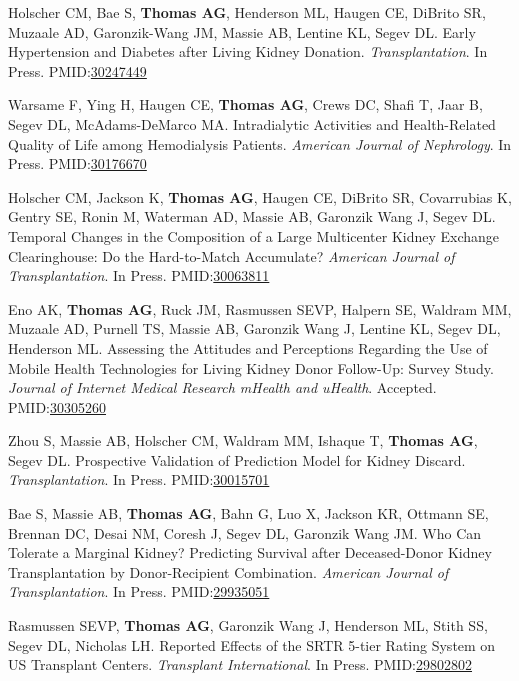 \documentclass[10pt]{article}
\makeatletter
\newlength{\bibhang}
\newlength{\bibsep}
 {\@listi \global\bibsep\itemsep \global\advance\bibsep by\parsep}
\newenvironment{bibenum*}
  {\renewcommand\labelenumi{[\theenumi]}%
   \etaremune[
     topsep=0pt,
     itemsep=\bibsep,
     parsep=0pt,partopsep=0pt,
     itemindent=-\bibhang,
     leftmargin={\bibhang+\widthof{[999]}}]}
  {\endetaremune}
\newcommand{\pmid}[1]{PMID:\href{https://www.ncbi.nlm.nih.gov/pubmed/#1}{#1}}
\makeatother
\begin{document}
\begin{bibenum*}
\item Holscher CM, Bae S, \textbf{Thomas AG}, Henderson ML, Haugen CE,
  DiBrito SR, Muzaale AD, Garonzik-Wang JM, Massie AB, Lentine KL, Segev DL.
  Early Hypertension and Diabetes after Living Kidney Donation.
  \emph{Transplantation}. In Press.
  \pmid{30247449} 

\item Warsame F, Ying H, Haugen CE, \textbf{Thomas AG}, Crews DC, Shafi T,
  Jaar B, Segev DL, McAdams-DeMarco MA. Intradialytic Activities and
  Health-Related Quality of Life among Hemodialysis Patients.
  \emph{American Journal of Nephrology}. In Press.
  \pmid{30176670} 

\item Holscher CM, Jackson K, \textbf{Thomas AG}, Haugen CE, DiBrito SR,
  Covarrubias K, Gentry SE, Ronin M, Waterman AD, Massie AB,
  Garonzik Wang J, Segev DL.
  Temporal Changes in the Composition of a Large Multicenter Kidney
  Exchange Clearinghouse: Do the Hard-to-Match Accumulate?
  \emph{American Journal of Transplantation}. In Press.
  \pmid{30063811} 

\item Eno AK, \textbf{Thomas AG}, Ruck JM, Rasmussen SEVP,
  Halpern SE, Waldram MM, Muzaale AD, Purnell TS, Massie AB,
  Garonzik Wang J, Lentine KL, Segev DL, Henderson ML.
  Assessing the Attitudes and Perceptions Regarding the Use of Mobile Health Technologies for Living Kidney Donor Follow-Up: Survey Study.
  \emph{Journal of Internet Medical Research mHealth and uHealth}.
  Accepted.
  \pmid{30305260} 

\item Zhou S, Massie AB, Holscher CM, Waldram MM, Ishaque T,
  \textbf{Thomas AG}, Segev DL. Prospective Validation of Prediction
  Model for Kidney Discard.
  \emph{Transplantation}. In Press.
  \pmid{30015701} 

\item Bae S, Massie AB, \textbf{Thomas AG}, Bahn G, Luo X, Jackson KR,
  Ottmann SE, Brennan DC, Desai NM, Coresh J, Segev DL, Garonzik Wang JM.
  Who Can Tolerate a Marginal Kidney? Predicting Survival after
  Deceased-Donor Kidney Transplantation by Donor-Recipient Combination.
  \emph{American Journal of Transplantation}. In Press.
  \pmid{29935051} 

\item Rasmussen SEVP, \textbf{Thomas AG}, Garonzik Wang J,
  Henderson ML, Stith SS, Segev DL, Nicholas LH. Reported Effects
  of the SRTR 5-tier Rating System on US Transplant Centers.
  \emph{Transplant International}. In Press.
  \pmid{29802802} 


\end{bibenum*}
\end{document}
